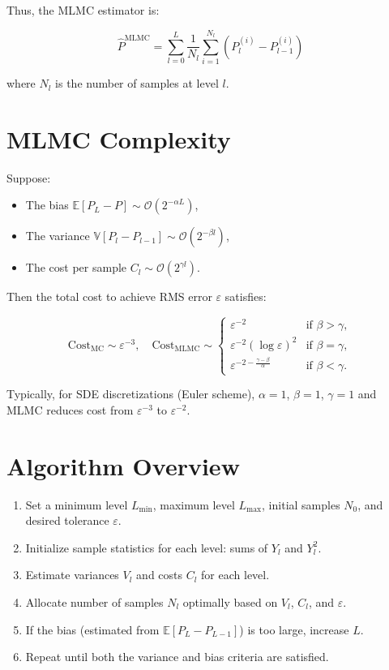 \documentclass{article}
\begin{document}
Thus, the MLMC estimator is:

\begin{equation}
\hat{P}^{\text{MLMC}} = \sum_{l=0}^{L} \frac{1}{N_l} \sum_{i=1}^{N_l} (P_l^{(i)} - P_{l-1}^{(i)})
\end{equation}

where $N_l$ is the number of samples at level $l$.

\section{MLMC Complexity}
Suppose:
\begin{itemize}
  \item The bias $\mathbb{E}[P_L - P] \sim \mathcal{O}(2^{-\alpha L})$,
  \item The variance $\mathbb{V}[P_l - P_{l-1}] \sim \mathcal{O}(2^{-\beta l})$,
  \item The cost per sample $C_l \sim \mathcal{O}(2^{\gamma l})$.
\end{itemize}

Then the total cost to achieve RMS error $\varepsilon$ satisfies:

\begin{equation}
\text{Cost}_{\text{MC}} \sim \varepsilon^{-3}, \quad \text{Cost}_{\text{MLMC}} \sim \begin{cases}
\varepsilon^{-2} & \text{if } \beta > \gamma, \\
\varepsilon^{-2} (\log \varepsilon)^2 & \text{if } \beta = \gamma, \\
\varepsilon^{-2-\frac{\gamma-\beta}{\alpha}} & \text{if } \beta < \gamma.
\end{cases}
\end{equation}

Typically, for SDE discretizations (Euler scheme), $\alpha=1$, $\beta=1$, $\gamma=1$ and MLMC reduces cost from $\varepsilon^{-3}$ to $\varepsilon^{-2}$.

\section{Algorithm Overview}

\begin{enumerate}
  \item Set a minimum level $L_{\text{min}}$, maximum level $L_{\text{max}}$, initial samples $N_0$, and desired tolerance $\varepsilon$.
  \item Initialize sample statistics for each level: sums of $Y_l$ and $Y_l^2$.
  \item Estimate variances $V_l$ and costs $C_l$ for each level.
  \item Allocate number of samples $N_l$ optimally based on $V_l$, $C_l$, and $\varepsilon$.
  \item If the bias (estimated from $\mathbb{E}[P_L - P_{L-1}]$) is too large, increase $L$.
  \item Repeat until both the variance and bias criteria are satisfied.
\end{enumerate}
\end{document}
